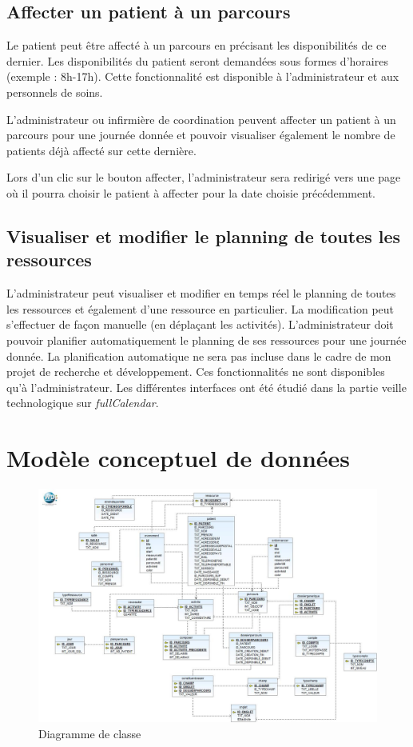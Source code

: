 \documentclass{polytech/polytech}
\begin{document}
\section{Affecter un patient à un parcours}


Le patient peut être affecté à un parcours en précisant les disponibilités de ce dernier. Les disponibilités du patient seront demandées sous formes d’horaires (exemple : 8h-17h). Cette fonctionnalité est disponible à l'administrateur et aux personnels de soins. 

L'administrateur ou infirmière de coordination peuvent affecter un patient à un parcours pour une journée donnée et pouvoir visualiser également le nombre de patients déjà affecté sur cette dernière.

Lors d'un clic sur le bouton affecter, l'administrateur sera redirigé vers une page où il pourra choisir le patient à affecter pour la date choisie précédemment.

\section{Visualiser et modifier le planning de toutes les ressources}

L'administrateur peut visualiser et modifier en temps réel le planning de toutes les ressources et également d'une ressource en particulier. La modification peut s'effectuer de façon manuelle (en déplaçant les activités). L'administrateur doit pouvoir planifier automatiquement le planning de ses ressources pour une journée donnée. La planification automatique ne sera pas incluse dans le cadre de mon projet de recherche et développement. Ces fonctionnalités ne sont disponibles qu’à l’administrateur. Les différentes interfaces ont été étudié dans la partie veille technologique sur \textit{fullCalendar}.

\chapter{Modèle conceptuel de données}
\label{ann:modeleBDD}

\begin{figure}
	\includegraphics[scale=0.5]{images/tablesBD}
	\caption{Diagramme de classe}
	\label{fig:modeleBDD}
\end{figure}
\end{document}
